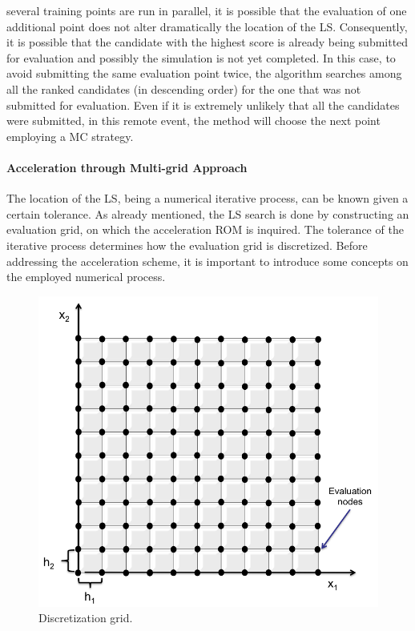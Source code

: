 several training points are run in parallel, it is possible that the 
evaluation of one additional point does not alter dramatically the 
location of the LS. Consequently, it is possible that the candidate with 
the highest score is already being submitted for evaluation and 
possibly the simulation is not yet completed. In this case, to avoid 
submitting the same evaluation point twice, the algorithm searches 
among all the ranked candidates (in descending order) for the one 
that was not submitted for evaluation. Even if it is extremely unlikely 
that all the candidates were submitted, in this remote event, the 
method will choose the next point employing a MC strategy.
\paragraph{Acceleration through Multi-grid Approach}
\label{par:LSaccelerationMultiGrid}
The location of the LS, being a numerical iterative process, can be 
known given a certain tolerance. As already mentioned, the LS search 
is done by constructing an evaluation grid, on which the acceleration 
ROM is inquired. The tolerance of the iterative process determines how 
the evaluation grid is discretized. Before addressing the acceleration 
scheme, it is important 
to introduce some concepts on the employed numerical process.
\begin{figure}[h!]
  \centering
  \includegraphics[width=1.0\textwidth]  {pics/DiscretizationGrid.png}
  \caption{Discretization grid.}
  \label{fig:DiscretizationGrid}
\end{figure}
